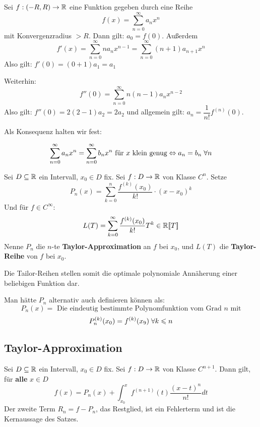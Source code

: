 \documentclass[main.tex]{subfiles}
\begin{document}
Sei $f:(-R,R) \to \mathbb{R}$ eine Funktion gegeben durch eine Reihe
$$f(x) = \sum \limits_{n=0}^\infty a_n x^n$$
mit Konvergenzradius $> R$. Dann gilt: $a_0 = f(0)$. Außerdem
$$f'(x) = \sum \limits_{n=0}^\infty n a_n x^{n-1} = \sum \limits_{n=0}^\infty (n+1) a_{n+1} x^n$$
Also gilt: $f'(0) = (0+1) a_1 = a_1$

Weiterhin:
$$f''(0) = \sum \limits_{n=0}^\infty n(n-1) a_{n} x^{n-2}$$
Also gilt: $f''(0) = 2(2-1) a_2 = 2 a_2$ und allgemein gilt: $a_n = \dfrac{1}{n!} f^{(n)}(0)$.

Als Konsequenz halten wir fest:

\begin{Theorem}
  $$\sum \limits_{n=0}^\infty a_n x^n = \sum \limits_{n=0}^\infty b_n x^n \text{ für $x$ klein genug} \Leftrightarrow a_n = b_n \;\forall n$$
\end{Theorem}

\begin{Definition}
  Sei $D \subseteq \mathbb{R}$ ein Intervall, $x_0 \in D$ fix. Sei $f: D \to \mathbb{R}$ von Klasse $C^n$. Setze
  $$P_n(x) = \sum \limits_{k=0}^n \dfrac{f^{(k)} (x_0)}{k!} \cdot (x - x_0)^k$$
  Und für $f \in C^\infty$:
  $$L(T) = \sum \limits_{k=0}^\infty \dfrac{f^{(k)} (x_0)}{k!} T^k \in \mathbb{R}[\![T]\!]$$
  Nenne $P_n$ die $n$-te \textbf{Taylor-Approximation} an $f$ bei $x_0$, und $L(T)$ die \textbf{Taylor-Reihe} von $f$ bei $x_0$.
\end{Definition}

\begin{Bemerkung}
  Die Tailor-Reihen stellen somit die optimale polynomiale Annäherung einer beliebigen Funktion dar.
\end{Bemerkung}

\begin{Bemerkung}
  Man hätte $P_n$ alternativ auch definieren können als:
  $$P_n(x) = \text{ Die eindeutig bestimmte Polynomfunktion vom Grad $n$ mit}$$
  $$P_n^{(k)} (x_0) = f^{(k)}(x_9) \;\forall k \leqslant n$$
\end{Bemerkung}

\subsection{Taylor-Approximation}

\begin{Theorem}
  Sei $D \subseteq \mathbb{R}$ ein Intervall, $x_0 \in D$ fix. Sei $f: D \to \mathbb{R}$ von Klasse $C^{n+1}$. Dann gilt, für \textbf{alle} $x \in D$
  $$f(x) = P_n(x) + \int_{x_0}^x f^{(n+1)}(t) \dfrac{(x-t)^n}{n!}dt$$
  Der zweite Term $R_n = f - P_n$, das Restglied, ist ein Fehlerterm und ist die Kernaussage des Satzes.
\end{Theorem}
\end{document}

